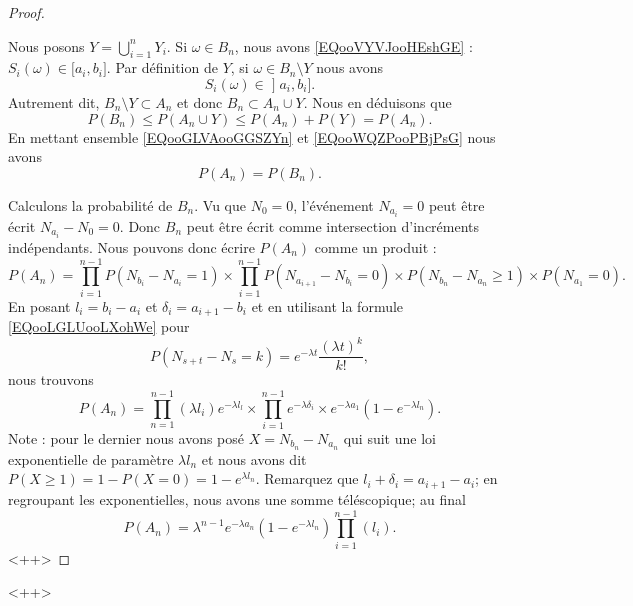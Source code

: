 \begin{proof}
\begin{subproof}
        Nous posons \( Y=\bigcup_{i=1}^nY_i\).
        \spitem[\( P(B_n)\leq P(A_n)\)]
        Si \( \omega\in B_n\), nous avons \eqref{EQooVYVJooHEshGE} : \( S_i(\omega)\in \mathopen[ a_i , b_i \mathclose]\). Par définition de \( Y\), si \( \omega\in B_n\setminus Y\) nous avons
        \begin{equation}
    S_i(\omega)\in \mathopen] a_i , b_i \mathclose].
        \end{equation}
        Autrement dit, \( B_n\setminus Y\subset A_n\) et donc \( B_n\subset A_n\cup Y\). Nous en déduisons que
        \begin{equation}    \label{EQooWQZPooPBjPsG}
            P(B_n)\leq P(A_n\cup Y)\leq P(A_n)+P(Y)=P(A_n).
        \end{equation}
        \spitem[\( P(A_n)=P(B_n)\)]
        En mettant ensemble \eqref{EQooGLVAooGGSZYn} et \eqref{EQooWQZPooPBjPsG} nous avons
        \begin{equation}
            P(A_n)=P(B_n).
        \end{equation}
    \end{subproof}
    Calculons la probabilité de \( B_n\). Vu que \( N_0=0\), l'événement \( N_{a_i}=0\) peut être écrit \( N_{a_i}-N_0=0\). Donc \( B_n\) peut être écrit comme intersection d'incréments indépendants. Nous pouvons donc écrire \( P(A_n)\) comme un produit :
    \begin{equation}
        P(A_n)=\prod_{i=1}^{n-1}P(N_{b_i}-N_{a_i}=1)\times\prod_{i=1}^{n-1}P(N_{a_{i+1}}-N_{b_i}=0)\times P(N_{b_n}-N_{a_n}\geq 1)\times P(N_{a_1}=0).
    \end{equation}
    En posant \( l_i=b_i-a_i\) et \( \delta_i=a_{i+1}-b_i\) et en utilisant la formule \eqref{EQooLGLUooLXohWe} pour
    \begin{equation}
        P(N_{s+t}-N_s=k)= e^{-\lambda t}\frac{ (\lambda t)^k }{ k! },
    \end{equation}
    nous trouvons
    \begin{equation}
        P(A_n)=\prod_{n=1}^{n-1}(\lambda l_i) e^{-\lambda l_l}\times \prod_{i=1}^{n-1} e^{-\lambda \delta_i}\times  e^{-\lambda a_1}(1- e^{-\lambda l_n}).
    \end{equation}
    Note : pour le dernier nous avons posé \( X=N_{b_n}-N_{a_n}\) qui suit une loi exponentielle de paramètre \( \lambda l_n\) et nous avons dit $P(X\geq 1)=1-P(X=0)=1- e^{\lambda l_n}$. Remarquez que \( l_i+\delta_i=a_{i+1}-a_i\); en regroupant les exponentielles, nous avons une somme téléscopique; au final
    \begin{equation}
        P(A_n)=\lambda^{n-1} e^{-\lambda a_n}(1- e^{-\lambda l_n})\prod_{i=1}^{n-1}(l_i).
    \end{equation}
    <++>

\end{proof}
<++>

